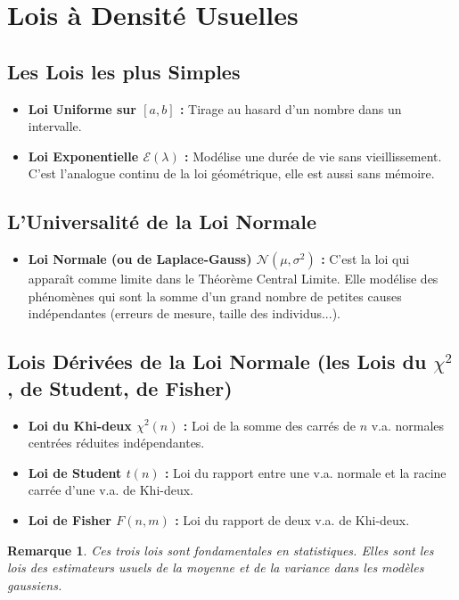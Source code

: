 \documentclass[12pt, a4paper, parskip=full]{report}
\theoremstyle{agregstyle}
\newtheorem{remark}[definition]{Remarque}
\begin{document}
\section{Lois à Densité Usuelles}
\subsection{Les Lois les plus Simples}
\begin{itemize}
    \item \textbf{Loi Uniforme sur $[a,b]$ :} Tirage au hasard d'un nombre dans un intervalle.
    \item \textbf{Loi Exponentielle $\mathcal{E}(\lambda)$ :} Modélise une durée de vie sans vieillissement. C'est l'analogue continu de la loi géométrique, elle est aussi sans mémoire.
\end{itemize}
\subsection{L'Universalité de la Loi Normale}
\begin{itemize}
    \item \textbf{Loi Normale (ou de Laplace-Gauss) $\mathcal{N}(\mu, \sigma^2)$ :} C'est la loi qui apparaît comme limite dans le Théorème Central Limite. Elle modélise des phénomènes qui sont la somme d'un grand nombre de petites causes indépendantes (erreurs de mesure, taille des individus...).
\end{itemize}
\subsection{Lois Dérivées de la Loi Normale (les Lois du $\chi^2$, de Student, de Fisher)}
\begin{itemize}
    \item \textbf{Loi du Khi-deux $\chi^2(n)$ :} Loi de la somme des carrés de $n$ v.a. normales centrées réduites indépendantes.
    \item \textbf{Loi de Student $t(n)$ :} Loi du rapport entre une v.a. normale et la racine carrée d'une v.a. de Khi-deux.
    \item \textbf{Loi de Fisher $F(n,m)$ :} Loi du rapport de deux v.a. de Khi-deux.
\end{itemize}
\begin{remark}
    Ces trois lois sont fondamentales en statistiques. Elles sont les lois des estimateurs usuels de la moyenne et de la variance dans les modèles gaussiens.
\end{remark}
\end{document}
